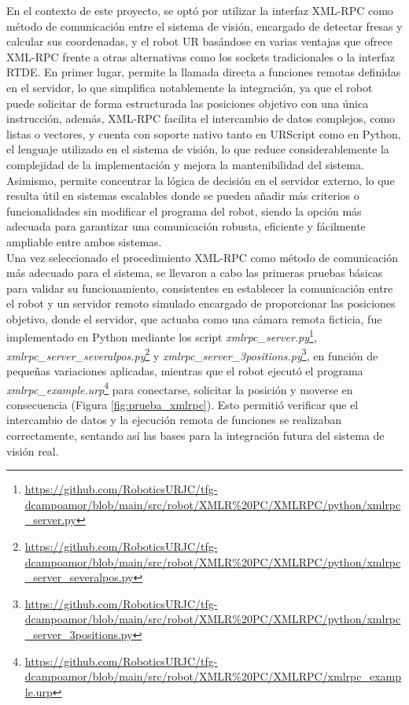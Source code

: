 En el contexto de este proyecto, se optó por utilizar la interfaz XML-RPC como método de comunicación entre el sistema de visión, encargado de detectar fresas y calcular sus coordenadas, y el robot UR basándose en varias ventajas que ofrece XML-RPC frente a otras alternativas como los sockets tradicionales o la interfaz RTDE. En primer lugar, permite la llamada directa a funciones remotas definidas en el servidor, lo que simplifica notablemente la integración, ya que el robot puede solicitar de forma estructurada las posiciones objetivo con una única instrucción, además, XML-RPC facilita el intercambio de datos complejos, como listas o vectores, y cuenta con soporte nativo tanto en URScript como en Python, el lenguaje utilizado en el sistema de visión, lo que reduce considerablemente la complejidad de la implementación y mejora la mantenibilidad del sistema. Asimismo, permite concentrar la lógica de decisión en el servidor externo, lo que resulta útil en sistemas escalables donde se pueden añadir más criterios o funcionalidades sin modificar el programa del robot, siendo la opción más adecuada para garantizar una comunicación robusta, eficiente y fácilmente ampliable entre ambos sistemas.\\

Una vez seleccionado el procedimiento XML-RPC como método de comunicación más adecuado para el sistema, se llevaron a cabo las primeras pruebas básicas para validar su funcionamiento, consistentes en establecer la comunicación entre el robot y un servidor remoto simulado encargado de proporcionar las posiciones objetivo, donde el servidor, que actuaba como una cámara remota ficticia, fue implementado en Python mediante los script \textit{xmlrpc\_server.py}\footnote{\url{https://github.com/RoboticsURJC/tfg-dcampoamor/blob/main/src/robot/XMLR\%20PC/XMLRPC/python/xmlrpc_server.py}}, \textit{xmlrpc\_server\_severalpos.py}\footnote{\url{https://github.com/RoboticsURJC/tfg-dcampoamor/blob/main/src/robot/XMLR\%20PC/XMLRPC/python/xmlrpc_server_severalpos.py}} y \textit{xmlrpc\_server\_3positions.py}\footnote{\url{https://github.com/RoboticsURJC/tfg-dcampoamor/blob/main/src/robot/XMLR\%20PC/XMLRPC/python/xmlrpc_server_3positions.py}}, en función de pequeñas variaciones aplicadas, mientras que el robot ejecutó el programa \textit{xmlrpc\_example.urp}\footnote{\url{https://github.com/RoboticsURJC/tfg-dcampoamor/blob/main/src/robot/XMLR\%20PC/XMLRPC/xmlrpc_example.urp}} para conectarse, solicitar la posición y moverse en consecuencia (Figura \ref{fig:prueba_xmlrpc}). Esto permitió verificar que el intercambio de datos y la ejecución remota de funciones se realizaban correctamente, sentando así las bases para la integración futura del sistema de visión real.

